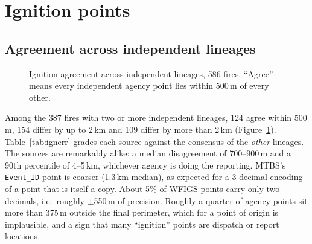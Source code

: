 \documentclass[11pt,a4paper]{article}
\begin{document}
\section{Ignition points}

\subsection{Agreement across independent lineages}

\begin{figure}[h]
\centering
{}
\caption{Ignition agreement across independent lineages, 586 fires. ``Agree'' means every independent agency
point lies within 500\,m of every other.}
\label{fig:agree}
\end{figure}

Among the 387 fires with two or more independent lineages, 124 agree within 500\,m, 154 differ by up to 2\,km
and 109 differ by more than 2\,km (Figure~\ref{fig:agree}). Table~\ref{tab:ignerr} grades each source against
the consensus of the \emph{other} lineages. The sources are remarkably alike: a median disagreement of
700--900\,m and a 90th percentile of 4--5\,km, whichever agency is doing the reporting. MTBS's
\texttt{Event\_ID} point is coarser (1.3\,km median), as expected for a 3-decimal encoding of a point that is
itself a copy. About 5\% of WFIGS points carry only two decimals, i.e.\ roughly $\pm$550\,m of precision.
Roughly a quarter of agency points sit more than 375\,m outside the final perimeter, which for a point of
origin is implausible, and a sign that many ``ignition'' points are dispatch or report locations.
\end{document}
